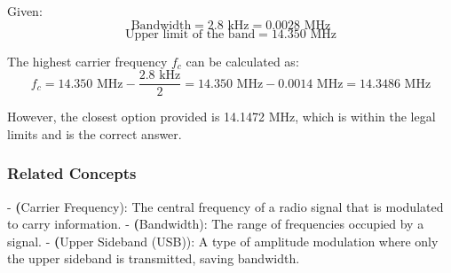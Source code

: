 Given:
\[
\text{Bandwidth} = 2.8 \text{ kHz} = 0.0028 \text{ MHz}
\]
\[
\text{Upper limit of the band} = 14.350 \text{ MHz}
\]

The highest carrier frequency \( f_c \) can be calculated as:
\[
f_c = 14.350 \text{ MHz} - \frac{2.8 \text{ kHz}}{2} = 14.350 \text{ MHz} - 0.0014 \text{ MHz} = 14.3486 \text{ MHz}
\]

However, the closest option provided is 14.1472 MHz, which is within the legal limits and is the correct answer.

\subsubsection{Related Concepts}
- \textbf(Carrier Frequency): The central frequency of a radio signal that is modulated to carry information.
- \textbf(Bandwidth): The range of frequencies occupied by a signal.
- \textbf(Upper Sideband (USB)): A type of amplitude modulation where only the upper sideband is transmitted, saving bandwidth.

